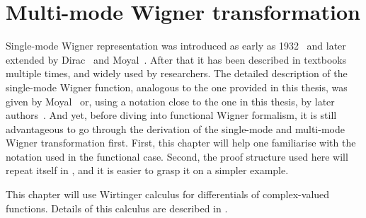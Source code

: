 \chapter{Multi-mode Wigner transformation}
\label{cha:mm-wigner}

Single-mode Wigner representation was introduced as early as 1932~\cite{Wigner1932} and later extended by Dirac~\cite{Dirac1945} and Moyal~\cite{Moyal1947}.
After that it has been described in textbooks multiple times, and widely used by researchers.
The detailed description of the single-mode Wigner function, analogous to the one provided in this thesis, was given by Moyal~\cite{Moyal1947} or, using a notation close to the one in this thesis, by later authors~\cite{Cahill1969,Hillery1984,Gardiner2004}.
And yet, before diving into functional Wigner formalism, it is still advantageous to go through the derivation of the single-mode and multi-mode Wigner transformation first.
First, this chapter will help one familiarise with the notation used in the functional case.
Second, the proof structure used here will repeat itself in , and it is easier to grasp it on a simpler example.

This chapter will use Wirtinger calculus for differentials of complex-valued functions.
Details of this calculus are described in .




